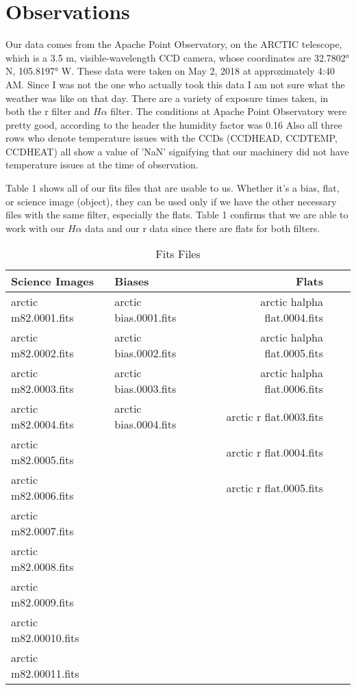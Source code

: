 \documentclass[modern]{aastex63}
\begin{document}
\section{Observations}
Our data comes from the Apache Point Observatory, on the ARCTIC telescope, which is a 3.5 m, visible-wavelength CCD camera, whose coordinates are 32.7802° N, 105.8197° W. These data were taken on May 2, 2018 at approximately 4:40 AM. Since I was not the one who actually took this data I am not sure what the weather was like on that day. There are a variety of exposure times taken, in both the r filter and $H\alpha$ filter. The conditions at Apache Point Observatory were pretty good, according to the header the humidity factor was 0.16 Also all three rows who denote temperature issues with the CCDs (CCDHEAD, CCDTEMP, CCDHEAT) all show a value of 'NaN' signifying that our machinery did not have temperature issues at the time of observation.

Table 1 shows all of our fits files that are usable to us. Whether it's a bias, flat, or science image (object), they can be used only if we have the other necessary files with the same filter, especially the flats. Table 1 confirms that we are able to work with our $H\alpha$ data and our r data since there are flats for both filters.

\begin{table}
\caption{Fits Files}
\begin{tabular}{llrrl}
\toprule

Science Images &Biases &Flats \\
\midrule
 arctic m82.0001.fits &   arctic bias.0001.fits &  arctic halpha flat.0004.fits\\
 arctic m82.0002.fits &   arctic bias.0002.fits &  arctic halpha flat.0005.fits\\
 arctic m82.0003.fits &   arctic bias.0003.fits &  arctic halpha flat.0006.fits\\
 arctic m82.0004.fits &   arctic bias.0004.fits &  arctic r flat.0003.fits \\
 arctic m82.0005.fits &                         &  arctic r flat.0004.fits\\
 arctic m82.0006.fits &                         &  arctic r flat.0005.fits\\
 arctic m82.0007.fits &       &     \\
 arctic m82.0008.fits &  &   &     \\
 arctic m82.0009.fits &    &   &     \\
 arctic m82.00010.fits &   &   &   \\
 arctic m82.00011.fits &      &   &  \\

 \bottomrule
\end{tabular}
\end{table}
\end{document}
